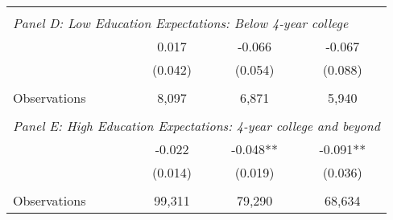 {\begin{tabular}{lccc}
&  &  &   \\
\multicolumn{4}{l}{\textit{Panel D: Low Education Expectations: Below 4-year college}} \\
\hspace{3mm}        &       0.017   &      -0.066   &      -0.067   \\
                    &     (0.042)   &     (0.054)   &     (0.088)   \\
                    &               &               &               \\
\hspace{3mm}Observations&       8,097   &       6,871   &       5,940   \\
 
&  &  &   \\
\multicolumn{4}{l}{\textit{Panel E: High Education Expectations: 4-year college and beyond}} \\
\hspace{3mm}        &      -0.022   &      -0.048** &      -0.091** \\
                    &     (0.014)   &     (0.019)   &     (0.036)   \\
                    &               &               &               \\
\hspace{3mm}Observations&      99,311   &      79,290   &      68,634   \\
 

\bottomrule
\end{tabular}
}
